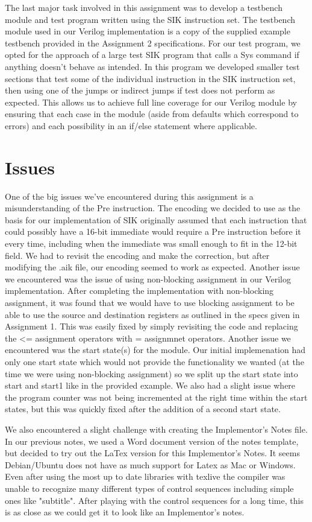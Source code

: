 \documentclass[12pt, twocolumn]{article}
\begin{document}
The last major task involved in this assignment was to develop a testbench module and test program written using the SIK instruction set. The testbench module used in our Verilog implementation is a copy of the supplied example testbench provided in the Assignment 2 specifications. For our test program, we opted for the approach of a large test SIK program that calls a Sys command if anything doesn’t behave as intended. In this program we developed smaller test sections that test some of the individual instruction in the SIK instruction set, then using one of the jumps or indirect jumps if test does not perform as expected. This allows us to achieve full line coverage for our Verilog module by ensuring that each case in the module (aside from defaults which correspond to errors) and each possibility in an if/else statement where applicable. 

\vfill\pagebreak

\section{Issues}

One of the big issues we've encountered during this assignment is a misunderstanding of the Pre instruction. The encoding we decided to use as the basis for our implementation of SIK originally assumed that each instruction that could possibly have a 16-bit immediate would require a Pre instruction before it every time, including when the immediate was small enough to fit in the 12-bit field. We had to revisit the encoding and make the correction, but after modifying the .aik file, our encoding seemed to work as expected. Another issue we encountered was the issue of using non-blocking assignment in our Verilog implementation. After completing the implementation with non-blocking assignment, it was found that we would have to use blocking assignment to be able to use the source and destination registers as outlined in the specs given in Assignment 1. This was easily fixed by simply revisiting the code and replacing the <= assignment operators with = assignmnet operators.  Another issue we encountered was the start state(s) for the module. Our initial implemenation had only one start state which would not provide the functionality we wanted (at the time we were using non-blocking assignment) so we split up the start state into start and start1 like in the provided example. We also had a slight issue where the program counter was not being incremented at the right time within the start states, but this was quickly fixed after the addition of a second start state. 

We also encountered a slight challenge with creating the Implementor's Notes file. In our previous notes, we used a Word document version of the notes template, but decided to try out the LaTex version for this Implementor's Notes. It seems Debian/Ubuntu does not have as much support for Latex as Mac or Windows.  Even after using the most up to date libraries with texlive the compiler was unable to recognize many different types of control sequences including simple ones like "subtitle".  After playing with the control sequences for a long time, this is as close as we could get it to look like an Implementor's notes.
\end{document}

